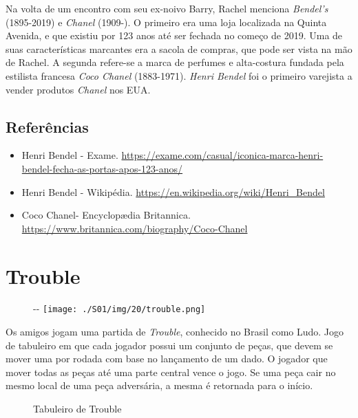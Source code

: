 Na volta de um encontro com seu ex-noivo Barry, Rachel menciona
\emph{Bendel's} (1895-2019) e \emph{Chanel} (1909-). O primeiro era uma
loja localizada na Quinta Avenida, e que existiu por 123 anos até ser
fechada no começo de 2019. Uma de suas características marcantes era a
sacola de compras, que pode ser vista na mão de Rachel. A segunda
refere-se a marca de perfumes e alta-costura fundada pela estilista
francesa \emph{Coco Chanel} (1883-1971). \emph{Henri Bendel} foi o
primeiro varejista a vender produtos \emph{Chanel} nos EUA.

\hypertarget{referuxeancias-2}{%
\subsection{Referências}\label{referuxeancias-2}}

\begin{itemize}
\tightlist
\item
  \sloppy Henri Bendel - Exame. \url{https://exame.com/casual/iconica-marca-henri-bendel-fecha-as-portas-apos-123-anos/}
\item
  \sloppy Henri Bendel - Wikipédia. \url{https://en.wikipedia.org/wiki/Henri_Bendel}
\item
  \sloppy Coco Chanel- Encyclopædia Britannica. \url{https://www.britannica.com/biography/Coco-Chanel}
\end{itemize}

\hypertarget{trouble}{%
\section{Trouble}\label{trouble}}

\begin{figure}[!ht]
  \begin{adjustwidth}{-\oddsidemargin-1in}{-\rightmargin}
    \centering
    \texttt{[image: ./S01/img/20/trouble.png]}
  \end{adjustwidth}
\end{figure}

Os amigos jogam uma partida de \emph{Trouble}, conhecido no Brasil como
Ludo. Jogo de tabuleiro em que cada jogador possui um conjunto de peças,
que devem se mover uma por rodada com base no lançamento de um dado. O
jogador que mover todas as peças até uma parte central vence o jogo. Se
uma peça cair no mesmo local de uma peça adversária, a mesma é retornada
para o início.

\begin{figure}
  \centering
    \caption{Tabuleiro de Trouble\label{fig:tabuleiro-de-trouble}}
\end{figure}

